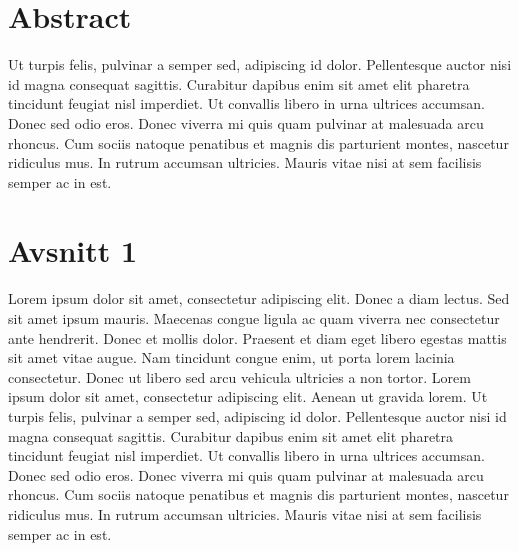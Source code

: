 \documentclass[12pt]{article}
\begin{document}
\blankpage

\section*{Abstract}
Ut turpis felis, pulvinar a semper sed, adipiscing id dolor. Pellentesque auctor nisi id magna consequat sagittis. Curabitur dapibus enim sit amet elit pharetra tincidunt feugiat nisl imperdiet. Ut convallis libero in urna ultrices accumsan. Donec sed odio eros. Donec viverra mi quis quam pulvinar at malesuada arcu rhoncus. Cum sociis natoque penatibus et magnis dis parturient montes, nascetur ridiculus mus. In rutrum accumsan ultricies. Mauris vitae nisi at sem facilisis semper ac in est.

\blankpage

\setcounter{tocdepth}{3}
\tableofcontents

\blankpage

\listoffigures

\blankpage

\listoftables

\blankpage

\setlength{\parskip}{0.2in}


\section{Avsnitt 1}
\label{sec-1}
Lorem ipsum dolor sit amet, consectetur adipiscing elit. Donec a diam lectus. Sed sit amet ipsum mauris. Maecenas congue ligula ac quam viverra nec consectetur ante hendrerit. Donec et mollis dolor. Praesent et diam eget libero egestas mattis sit amet vitae augue. Nam tincidunt congue enim, ut porta lorem lacinia consectetur. Donec ut libero sed arcu vehicula ultricies a non tortor. Lorem ipsum dolor sit amet, consectetur adipiscing elit. Aenean ut gravida lorem. Ut turpis felis, pulvinar a semper sed, adipiscing id dolor. Pellentesque auctor nisi id magna consequat sagittis. Curabitur dapibus enim sit amet elit pharetra tincidunt feugiat nisl imperdiet. Ut convallis libero in urna ultrices accumsan. Donec sed odio eros. Donec viverra mi quis quam pulvinar at malesuada arcu rhoncus. Cum sociis natoque penatibus et magnis dis parturient montes, nascetur ridiculus mus. In rutrum accumsan ultricies. Mauris vitae nisi at sem facilisis semper ac in est.
\end{document}
